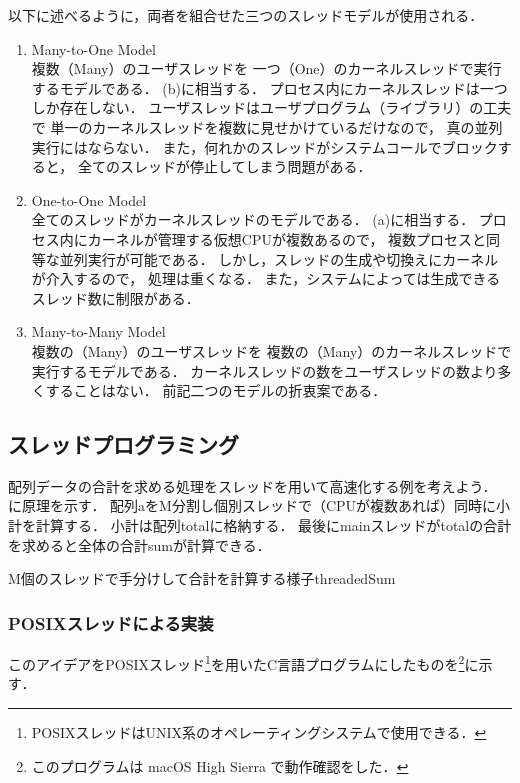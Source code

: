 以下に述べるように，両者を組合せた三つのスレッドモデルが使用される．

\begin{enumerate}
\item Many-to-One Model \\
複数（Many）のユーザスレッドを
一つ（One）のカーネルスレッドで実行するモデルである．
(b)に相当する．
プロセス内にカーネルスレッドは一つしか存在しない．
ユーザスレッドはユーザプログラム（ライブラリ）の工夫で
単一のカーネルスレッドを複数に見せかけているだけなので，
真の並列実行にはならない．
また，何れかのスレッドがシステムコールでブロックすると，
全てのスレッドが停止してしまう問題がある．

\item One-to-One Model \\
全てのスレッドがカーネルスレッドのモデルである．
(a)に相当する．
プロセス内にカーネルが管理する仮想CPUが複数あるので，
複数プロセスと同等な並列実行が可能である．
しかし，スレッドの生成や切換えにカーネルが介入するので，
処理は重くなる．
また，システムによっては生成できるスレッド数に制限がある．

\item Many-to-Many Model \\
複数の（Many）のユーザスレッドを
複数の（Many）のカーネルスレッドで実行するモデルである．
カーネルスレッドの数をユーザスレッドの数より多くすることはない．
前記二つのモデルの折衷案である．
\end{enumerate}

\subsection{スレッドプログラミング}
配列データの合計を求める処理をスレッドを用いて高速化する例を考えよう．
に原理を示す．
配列aをM分割し個別スレッドで（CPUが複数あれば）同時に小計を計算する．
小計は配列totalに格納する．
最後にmainスレッドがtotalの合計を求めると全体の合計sumが計算できる．

{M個のスレッドで手分けして合計を計算する様子}{threadedSum}

\subsubsection{POSIXスレッドによる実装}
このアイデアをPOSIXスレッド\footnote{
POSIXスレッドはUNIX系のオペレーティングシステムで使用できる．
}を用いたC言語プログラムにしたものを\footnote{
このプログラムは macOS High Sierra で動作確認をした．}に示す．

